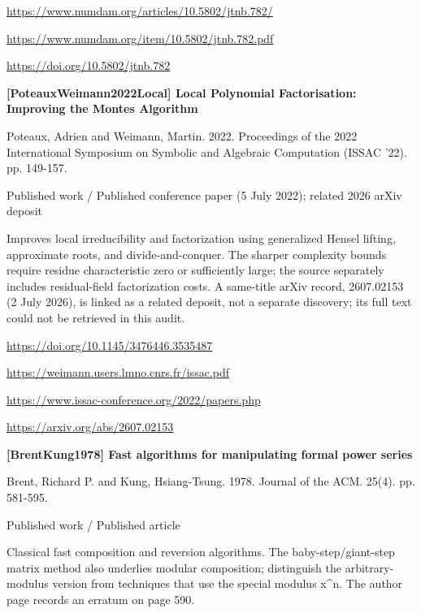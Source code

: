 \documentclass[11pt,a4paper,oneside,openany]{book}
\begin{document}
{\footnotesize\url{https://www.numdam.org/articles/10.5802/jtnb.782/}}\par
{\footnotesize\url{https://www.numdam.org/item/10.5802/jtnb.782.pdf}}\par
{\footnotesize\url{https://doi.org/10.5802/jtnb.782}}\par
\vspace{9pt}
\hypertarget{ref:PoteauxWeimann2022Local}{}
{\sffamily\bfseries\color{atlasgreen}[PoteauxWeimann2022Local] Local Polynomial Factorisation: Improving the Montes Algorithm}\par
\color{black} Poteaux, Adrien and Weimann, Martin. 2022. Proceedings of the 2022 International Symposium on Symbolic and Algebraic Computation (ISSAC '22). pp. 149-157.\par
{\small\sffamily\color{atlasgold}Published work / Published conference paper (5 July 2022); related 2026 arXiv deposit}\par
\color{black} Improves local irreducibility and factorization using generalized Hensel lifting, approximate roots, and divide-and-conquer. The sharper complexity bounds require residue characteristic zero or sufficiently large; the source separately includes residual-field factorization costs. A same-title arXiv record, 2607.02153 (2 July 2026), is linked as a related deposit, not a separate discovery; its full text could not be retrieved in this audit.\par
{\footnotesize\url{https://doi.org/10.1145/3476446.3535487}}\par
{\footnotesize\url{https://weimann.users.lmno.cnrs.fr/issac.pdf}}\par
{\footnotesize\url{https://www.issac-conference.org/2022/papers.php}}\par
{\footnotesize\url{https://arxiv.org/abs/2607.02153}}\par
\vspace{9pt}
\hypertarget{ref:BrentKung1978}{}
{\sffamily\bfseries\color{atlasgreen}[BrentKung1978] Fast algorithms for manipulating formal power series}\par
\color{black} Brent, Richard P. and Kung, Hsiang-Tsung. 1978. Journal of the ACM. 25(4). pp. 581-595.\par
{\small\sffamily\color{atlasgold}Published work / Published article}\par
\color{black} Classical fast composition and reversion algorithms. The baby-step/giant-step matrix method also underlies modular composition; distinguish the arbitrary-modulus version from techniques that use the special modulus x\textasciicircum{}n. The author page records an erratum on page 590.\par
\end{document}
